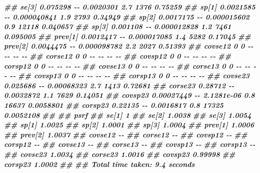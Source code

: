 \documentclass[
  ignorenonframetext,
  aspectratio=169,
]{beamer}
\newenvironment{Shaded}{\begin{snugshade}}{\end{snugshade}}
\newcommand{\DocumentationTok}[1]{\textcolor[rgb]{0.56,0.35,0.01}{\textbf{\textit{#1}}}}
\begin{document}
\begin{frame}[fragile]
\begin{Shaded}
\begin{Highlighting}[]
\DocumentationTok{\#\# se[3]     0.075298   {-}{-}   0.0020301     2.7  1376   0.75259}
\DocumentationTok{\#\# sp[1]    0.0021585   {-}{-} 0.000040841     1.9  2793   0.34949}
\DocumentationTok{\#\# sp[2]    0.0017175   {-}{-} 0.000015602     0.9 12118  0.040657}
\DocumentationTok{\#\# sp[3]     0.001108   {-}{-} 0.000012828     1.2  7461  0.095005}
\DocumentationTok{\#\# prev[1]  0.0012417   {-}{-} 0.000017085     1.4  5282   0.17045}
\DocumentationTok{\#\# prev[2]  0.0044475   {-}{-} 0.000098782     2.2  2027   0.51393}
\DocumentationTok{\#\# covse12          0    0          {-}{-}      {-}{-}    {-}{-}        {-}{-}}
\DocumentationTok{\#\# corse12          0    0          {-}{-}      {-}{-}    {-}{-}        {-}{-}}
\DocumentationTok{\#\# covsp12          0    0          {-}{-}      {-}{-}    {-}{-}        {-}{-}}
\DocumentationTok{\#\# corsp12          0    0          {-}{-}      {-}{-}    {-}{-}        {-}{-}}
\DocumentationTok{\#\# covse13          0    0          {-}{-}      {-}{-}    {-}{-}        {-}{-}}
\DocumentationTok{\#\# corse13          0    0          {-}{-}      {-}{-}    {-}{-}        {-}{-}}
\DocumentationTok{\#\# covsp13          0    0          {-}{-}      {-}{-}    {-}{-}        {-}{-}}
\DocumentationTok{\#\# corsp13          0    0          {-}{-}      {-}{-}    {-}{-}        {-}{-}}
\DocumentationTok{\#\# covse23   0.025686   {-}{-}  0.00068323     2.7  1413   0.72681}
\DocumentationTok{\#\# corse23    0.28712   {-}{-}   0.0032872     1.1  7629   0.14051}
\DocumentationTok{\#\# covsp23 0.00027449   {-}{-}  2.1281e{-}06     0.8 16637 0.0058801}
\DocumentationTok{\#\# corsp23    0.22135   {-}{-}   0.0016817     0.8 17325 0.0052108}
\DocumentationTok{\#\#                }
\DocumentationTok{\#\#            psrf}
\DocumentationTok{\#\# se[1]         1}
\DocumentationTok{\#\# se[2]    1.0038}
\DocumentationTok{\#\# se[3]    1.0054}
\DocumentationTok{\#\# sp[1]    1.0025}
\DocumentationTok{\#\# sp[2]    1.0001}
\DocumentationTok{\#\# sp[3]    1.0004}
\DocumentationTok{\#\# prev[1]  1.0006}
\DocumentationTok{\#\# prev[2]  1.0037}
\DocumentationTok{\#\# covse12      {-}{-}}
\DocumentationTok{\#\# corse12      {-}{-}}
\DocumentationTok{\#\# covsp12      {-}{-}}
\DocumentationTok{\#\# corsp12      {-}{-}}
\DocumentationTok{\#\# covse13      {-}{-}}
\DocumentationTok{\#\# corse13      {-}{-}}
\DocumentationTok{\#\# covsp13      {-}{-}}
\DocumentationTok{\#\# corsp13      {-}{-}}
\DocumentationTok{\#\# covse23  1.0034}
\DocumentationTok{\#\# corse23  1.0016}
\DocumentationTok{\#\# covsp23 0.99998}
\DocumentationTok{\#\# corsp23  1.0002}
\DocumentationTok{\#\# }
\DocumentationTok{\#\# Total time taken: 9.4 seconds}
\end{Highlighting}
\end{Shaded}

\normalsize
\end{frame}
\end{document}
